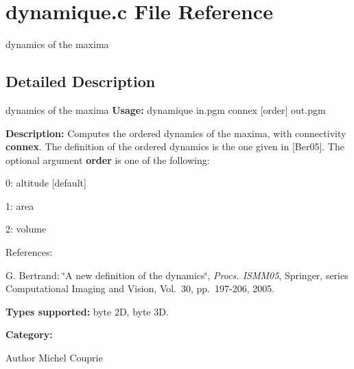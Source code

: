 \section{dynamique.c File Reference}
\label{dynamique_8c}


dynamics of the maxima  




\subsection{Detailed Description}
dynamics of the maxima {\bfseries Usage:} dynamique in.pgm connex [order] out.pgm

{\bfseries Description:} Computes the ordered dynamics of the maxima, with connectivity {\bfseries connex}. The definition of the ordered dynamics is the one given in [Ber05]. The optional argument {\bfseries order} is one of the following: \begin{DoxyItemize}
\item 0: altitude [default] \item 1: area \item 2: volume\end{DoxyItemize}
References:\par
 [Ber05] G. Bertrand: \char`\"{}A new definition of the dynamics\char`\"{}, {\itshape Procs. ISMM05\/}, Springer, series Computational Imaging and Vision, Vol.~30, pp.~197-\/206, 2005.\par


{\bfseries Types supported:} byte 2D, byte 3D.

{\bfseries Category:}

\begin{DoxyAuthor}{Author}
Michel Couprie 
\end{DoxyAuthor}
